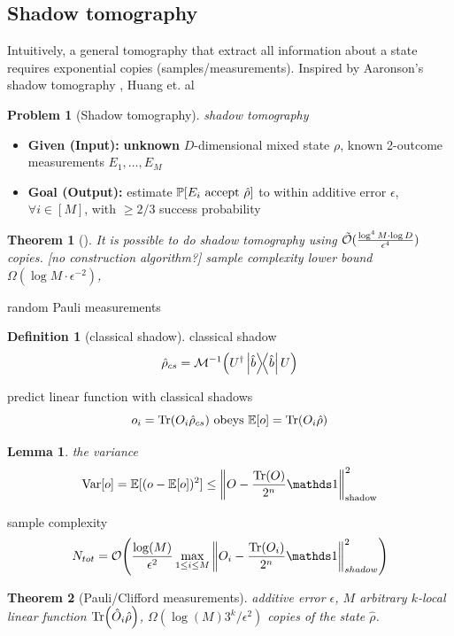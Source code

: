 \documentclass[
aps,
pra,
linenumbers,
floatfix,
]{revtex4-2}
\theoremstyle{plain}
\newtheorem{theorem}{Theorem}
\newtheorem{lemma}{Lemma}
\theoremstyle{definition}
\newtheorem{definition}{Definition}
\newtheorem{problem}{Problem}
\newcommand{\ob}{\hat{O}}
\newcommand{\dm}{\hat{\rho}}
\begin{document}
\subsection{Shadow tomography}
Intuitively, a general tomography \cite{altepeterPhotonicStateTomography2005} that extract all information about a state requires exponential copies (samples/measurements).
Inspired by Aaronson's shadow tomography \cite{aaronsonShadowTomographyQuantum2018}, Huang et. al \cite{huangPredictingManyProperties2020}
\begin{problem}[Shadow tomography]
	\emph{shadow tomography}
	\begin{itemize}
		\item \textbf{Given (Input):} \textbf{unknown} $D$-dimensional mixed state $\rho$, known 2-outcome measurements $E_1,\dots,E_M$
		\item \textbf{Goal (Output):} estimate $\probability[E_i \text{ accept } \dm]$ to within additive error $\epsilon$, $\forall i\in [M]$, with $\ge 2/3$ success probability
	\end{itemize}
\end{problem}
\begin{theorem}[\cite{aaronsonShadowTomographyQuantum2018}]
	It is possible to do shadow tomography using $\tilde{\mathcal{O}}(\frac{\log^4 M\cdot \log D}{\epsilon^4})$ copies. [no construction algorithm?]
	sample complexity lower bound $\Omega(\log M\cdot \epsilon^{-2})$, 
\end{theorem}
	random Pauli measurements
\begin{definition}[classical shadow]\label{def:classical_shadow}
	classical shadow
	\begin{equation}
		\dm_{cs} = \mathcal{M}^{-1} \qty(U^\dagger \op{\hat{b}} U)
	\end{equation}
\end{definition}
predict linear function with classical shadows
\begin{equation}
	o_i = \Tr(O_i \dm_{cs})
	\text{ obeys }
	\expectation[o] =\Tr(O_i \dm)
\end{equation}
\begin{lemma}
	the variance
	\begin{equation}
		\variance[o] = \expectation[(o-\expectation[o])^2]
		\le \norm{O - \frac{\Tr(O)}{2^n} \identity}^2_{\text{shadow}}
	\end{equation}
\end{lemma}
sample complexity
\begin{equation}
	N_{tot} = \bigO \qty(
		\frac{\log (M)}{\epsilon^2} \max_{1\le i\le M} 
		\norm{O_i - \frac{\Tr(O_i)}{2^n} \identity}^2_{shadow}
	)
\end{equation}
\begin{theorem}[Pauli/Clifford measurements]
	additive error $\epsilon$, $M$ arbitrary $k$-local linear function $\Tr(\ob_i\dm)$,
	$\Omega(\log(M) 3^k/\epsilon^2)$ copies of the state $\dm$.
\end{theorem}
\end{document}
